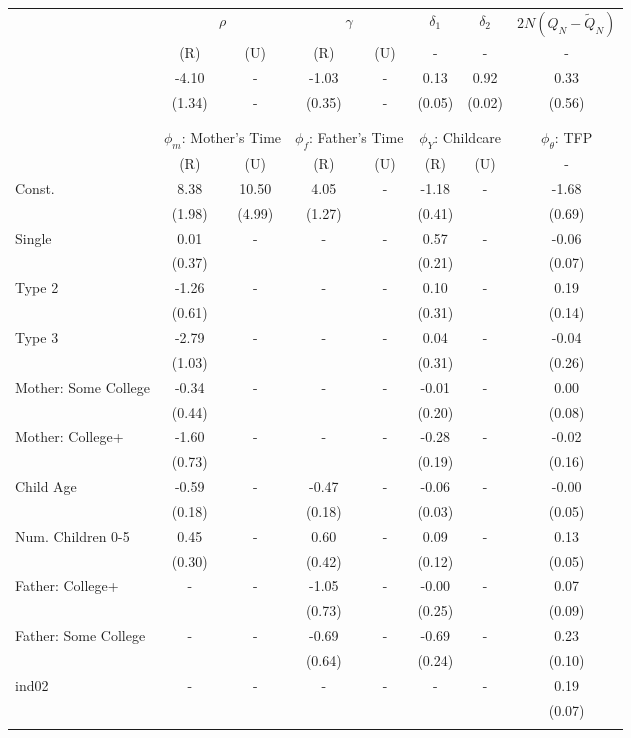 \begin{tabular}{lccccccc}\toprule
 & \multicolumn{2}{c}{$\rho$} & \multicolumn{2}{c}{$\gamma$} & {$\delta_{1}$} & {$\delta_{2}$} & $2N(Q_{N} - \tilde{Q}_{N})$ \\
 & (R) & (U) & (R) & (U) & - & - & - \\\cmidrule(r){2-3}\cmidrule(r){4-5}\cmidrule(r){6-6}\cmidrule(r){7-7}\cmidrule(r){8-8}
&-4.10& - &-1.03& - &0.13&0.92&0.33\\
&(1.34)& - &(0.35)& - &(0.05)&(0.02)&(0.56)\\
\\
&&&&&&&\\
 & \multicolumn{2}{c}{$\phi_{m}$: Mother's Time} & \multicolumn{2}{c}{$\phi_{f}$: Father's Time} & \multicolumn{2}{c}{$\phi_{Y}$: Childcare} &{$\phi_{\theta}$: TFP} \\
 & (R) & (U) & (R) & (U) & (R) & (U) & -  \\\cmidrule(r){2-3}\cmidrule(r){4-5}\cmidrule(r){6-7}\cmidrule(r){8-8}
Const.&8.38&10.50&4.05& -&-1.18& -&-1.68\\
&(1.98)&(4.99)&(1.27)&&(0.41)&&(0.69)\\
Single&0.01& -& - & -&0.57& -&-0.06\\
&(0.37)& & &&(0.21)&&(0.07)\\
Type 2&-1.26& -& - & -&0.10& -&0.19\\
&(0.61)& & &&(0.31)&&(0.14)\\
Type 3&-2.79& -& - & -&0.04& -&-0.04\\
&(1.03)& & &&(0.31)&&(0.26)\\
Mother: Some College&-0.34& -& - & -&-0.01& -&0.00\\
&(0.44)& & &&(0.20)&&(0.08)\\
Mother: College+&-1.60& -& - & -&-0.28& -&-0.02\\
&(0.73)& & &&(0.19)&&(0.16)\\
Child Age&-0.59& -&-0.47& -&-0.06& -&-0.00\\
&(0.18)&&(0.18)&&(0.03)&&(0.05)\\
Num. Children 0-5&0.45& -&0.60& -&0.09& -&0.13\\
&(0.30)&&(0.42)&&(0.12)&&(0.05)\\
Father: College+& - & -&-1.05& -&-0.00& -&0.07\\
 & &&(0.73)&&(0.25)&&(0.09)\\
Father: Some College& - & -&-0.69& -&-0.69& -&0.23\\
 & &&(0.64)&&(0.24)&&(0.10)\\
ind02& - & -& - & -& - & -&0.19\\
 & & & & & &&(0.07)\\
\\
\bottomrule\end{tabular}
